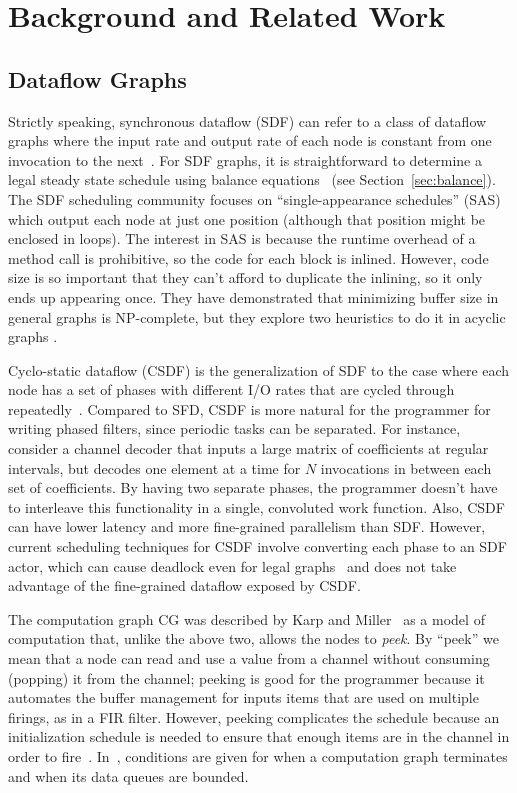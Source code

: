 \section{Background and Related Work}
\label{sec:related}

\subsection{Dataflow Graphs}

Strictly speaking, synchronous dataflow (SDF) can refer to a class of
dataflow graphs where the input rate and output rate of each node is
constant from one invocation to the next~\cite{LM87-i,LM87-ii}.  For
SDF graphs, it is straightforward to determine a legal steady state
schedule using balance equations~\cite{leesdf} (see
Section~\ref{sec:balance}).  The SDF scheduling community focuses on
``single-appearance schedules'' (SAS) which output each node at just
one position (although that position might be enclosed in loops).  The
interest in SAS is because the runtime overhead of a method call is
prohibitive, so the code for each block is inlined.  However, code
size is so important that they can't afford to duplicate the inlining,
so it only ends up appearing once.  They have demonstrated that
minimizing buffer size in general graphs is NP-complete, but they
explore two heuristics to do it in acyclic graphs \cite{Bhatta97}.

Cyclo-static dataflow (CSDF) is the generalization of SDF to the case
where each node has a set of phases with different I/O rates that are
cycled through repeatedly~\cite{BELP96,Parks95}.  Compared to SFD,
CSDF is more natural for the programmer for writing phased filters,
since periodic tasks can be separated.  For instance, consider a
channel decoder that inputs a large matrix of coefficients at regular
intervals, but decodes one element at a time for $N$ invocations in
between each set of coefficients.  By having two separate phases, the
programmer doesn't have to interleave this functionality in a single,
convoluted work function.  Also, CSDF can have lower latency and more
fine-grained parallelism than SDF.  However, current scheduling
techniques for CSDF involve converting each phase to an SDF actor,
which can cause deadlock even for legal graphs~\cite{BELP96} and does
not take advantage of the fine-grained dataflow exposed by CSDF.

The computation graph {CG} was described by Karp and
Miller~\cite{Karp67} as a model of computation that, unlike the above
two, allows the nodes to {\it peek}.  By ``peek'' we mean that a node
can read and use a value from a channel without consuming (popping) it
from the channel; peeking is good for the programmer because it
automates the buffer management for inputs items that are used on
multiple firings, as in a FIR filter.  However, peeking complicates
the schedule because an initialization schedule is needed to ensure
that enough items are in the channel in order to fire~\cite{Gordo02}.
In~\cite{Karp67}, conditions are given for when a computation graph
terminates and when its data queues are bounded.

